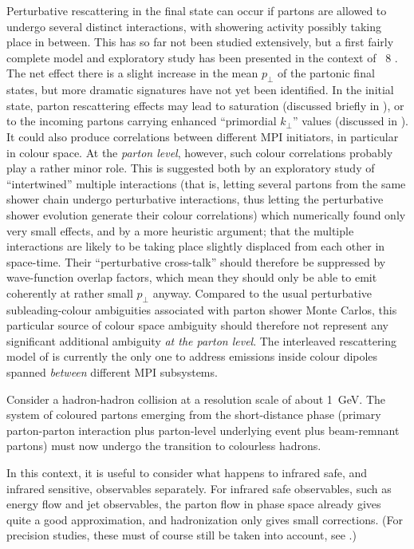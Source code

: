 Perturbative rescattering in the final state can occur if
partons are allowed to undergo several distinct interactions, with
showering activity possibly taking place in between. This has so far
not been studied extensively, but a first
fairly complete model and exploratory study has been presented in the
context of \pythia~8 \cite{Corke:2009tk}.
The net effect there is a slight increase in the mean $p_\perp$ of the
partonic final states, but more dramatic signatures have not yet been
identified. In the initial state, parton rescattering effects may lead
to saturation (discussed briefly in ),
or to the incoming partons carrying enhanced
``primordial $k_\perp$'' values (discussed in
). It could also produce  correlations
between different MPI initiators, in particular in colour
space. At the \emph{parton level}, however, such
colour correlations probably play a rather minor role.
This is suggested both by an exploratory study of ``intertwined''
multiple interactions \cite{Sjostrand:2004ef} (that is,
letting several partons from the same shower chain undergo
perturbative interactions, thus letting the perturbative shower
evolution generate their colour correlations)
which numerically found only very small effects, and by a
more heuristic argument; that the multiple interactions are likely to
be taking place slightly displaced from each other in
space-time. Their ``perturbative cross-talk'' should therefore be
suppressed by wave-function overlap
factors, which mean they should only be able to emit coherently at
rather small $p_\perp$ anyway.
Compared to the usual perturbative subleading-colour ambiguities
associated with parton shower Monte Carlos, this particular source of
colour space ambiguity should therefore not represent any significant
additional ambiguity \emph{at the parton level}. The interleaved
rescattering model of \cite{Corke:2009tk} is currently the only one to
address emissions inside colour dipoles spanned
\emph{between} different MPI subsystems.


Consider a hadron-hadron collision at a
resolution scale of about 1~GeV. The system of coloured partons emerging
from the short-distance phase (primary parton-parton interaction plus
parton-level underlying event plus beam-remnant partons)
must now undergo the transition to colourless hadrons.

In this context, it is useful to consider what happens to
infrared safe, and infrared sensitive, observables separately.
For infrared safe observables, such as
energy flow and jet observables, the parton flow in phase space
already gives quite a good
approximation, and hadronization only gives small corrections. (For
precision studies, these must of course still be taken into account, see \eg
\cite{Bhatti:2005ai,Dasgupta:2007wa}.)

